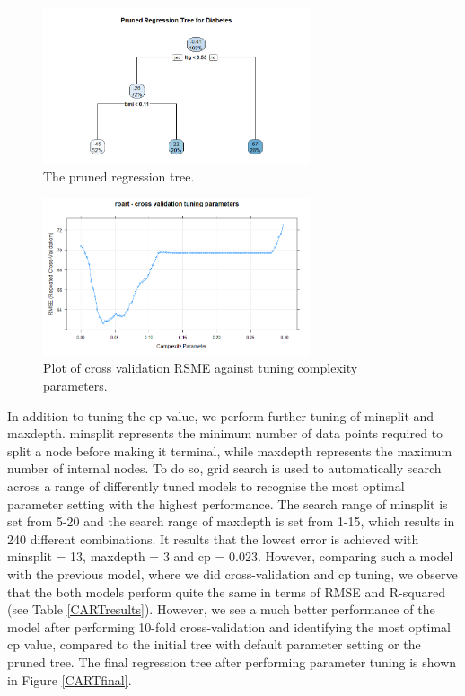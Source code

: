 \documentclass{usiinftr}
\begin{document}
\begin{figure}[h!] 
\centering
\includegraphics[width=0.7\textwidth]{images/image124.png}
\caption{The pruned regression tree.}
\label{CARTpruned}
\end{figure}

\begin{figure}[h!] 
\centering
\includegraphics[width=0.7\textwidth]{images/image127.png}
\caption{Plot of cross validation RSME against tuning complexity parameters.}
\label{CARTtune}
\end{figure}

In addition to tuning the cp value, we perform further tuning of minsplit and maxdepth. minsplit represents the minimum number of data points required to split a node before making it terminal, while maxdepth represents the maximum number of internal nodes.  To do so, grid search is used to automatically search across a range of differently tuned models to recognise the most optimal parameter setting with the highest performance. The search range of minsplit is set from 5-20 and the search range of maxdepth is set from 1-15, which results in 240 different combinations. It results that the lowest error is achieved with minsplit = 13, maxdepth = 3 and cp = 0.023. However, comparing such a model with the previous model, where we did cross-validation and cp tuning, we observe that the both models perform quite the same in terms of RMSE and R-squared (see Table \ref{CARTresults}). However, we see a much better performance of the model after performing 10-fold cross-validation and identifying the most optimal cp value, compared to the initial tree with default parameter setting or the pruned tree. The final regression tree after performing parameter tuning is shown in Figure \ref{CARTfinal}.
\end{document}
